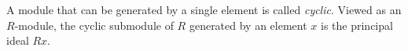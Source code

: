 A module that can be generated by a single element is called \emph{cyclic}. Viewed as an $R$-module, the cyclic submodule of $R$ generated by an element $x$ is the principal ideal $Rx$.
